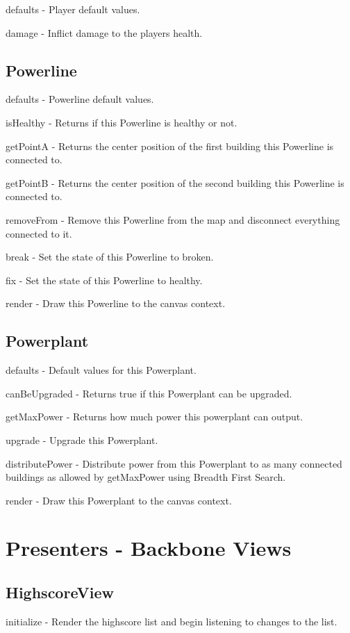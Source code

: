	defaults - Player default values.

	damage - Inflict damage to the players health.

\subsection*{Powerline}

	defaults - Powerline default values.

	isHealthy - Returns if this Powerline is healthy or not.

	getPointA - Returns the center position of the first building this Powerline is connected to.

	getPointB - Returns the center position of the second building this Powerline is connected to.

	removeFrom - Remove this Powerline from the map and disconnect everything connected to it.

	break - Set the state of this Powerline to broken.

	fix - Set the state of this Powerline to healthy.

	render - Draw this Powerline to the canvas context.

\subsection*{Powerplant}

	defaults - Default values for this Powerplant.

	canBeUpgraded - Returns true if this Powerplant can be upgraded.

	getMaxPower - Returns how much power this powerplant can output.

	upgrade - Upgrade this Powerplant.

	distributePower - Distribute power from this Powerplant to as many connected buildings as allowed by getMaxPower using Breadth First Search.

	render - Draw this Powerplant to the canvas context.

\clearpage

\section{Presenters - Backbone Views}

\subsection*{HighscoreView}
	initialize - Render the highscore list and begin listening to changes to the list.
	
